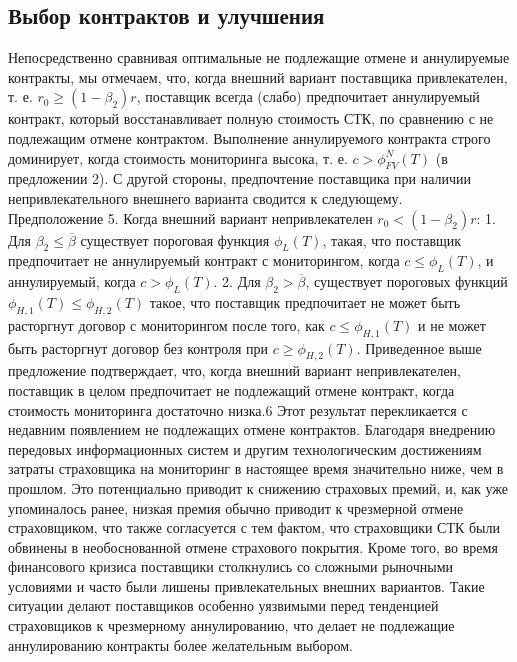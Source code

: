 \documentclass[a4paper,12pt]{article}
\begin{document}
\subsection{Выбор контрактов и улучшения}
Непосредственно сравнивая оптимальные не подлежащие отмене и аннулируемые контракты, мы отмечаем, что, когда внешний вариант поставщика привлекателен, т. е. $r_{0} \geq (1-\beta_{2})r$, поставщик всегда (слабо) предпочитает аннулируемый контракт, который восстанавливает полную стоимость СТК, по сравнению с не подлежащим отмене контрактом. Выполнение аннулируемого контракта строго доминирует, когда стоимость мониторинга высока, т. е. $c > \phi_{FV}^{N}(T)$ (в предложении 2). С другой стороны, предпочтение поставщика при наличии непривлекательного внешнего варианта сводится к следующему.
\\
Предположение 5. Когда внешний вариант непривлекателен $r_{0} < (1-\beta_{2})r$:
1. Для $\beta_{2} \leq \overline{\beta}$ существует пороговая функция $\phi_{L}(T)$, такая, что поставщик предпочитает не аннулируемый контракт с мониторингом, когда $c \leq \phi_{L}(T)$, и аннулируемый, когда $c > \phi_{L}(T)$.
2. Для $\beta_{2} > \overline{\beta}$, существует пороговых функций $\phi_{H,1}(T) \leq \phi_{H,2}(T)$ такое, что поставщик предпочитает не может быть расторгнут договор с мониторингом после того, как $c \leq \phi_{H,1}(T)$ и не может быть расторгнут договор
без контроля при $c \geq \phi_{H,2}(T)$.
Приведенное выше предложение подтверждает, что, когда внешний вариант непривлекателен, поставщик в целом предпочитает не подлежащий отмене контракт, когда стоимость мониторинга достаточно низка.6 Этот результат перекликается с недавним появлением не подлежащих отмене контрактов. Благодаря внедрению передовых информационных систем и другим технологическим достижениям затраты страховщика на мониторинг в настоящее время значительно ниже, чем в прошлом. Это потенциально приводит к снижению страховых премий, и, как уже упоминалось ранее, низкая премия обычно приводит к чрезмерной отмене страховщиком, что также согласуется с тем фактом, что страховщики СТК были обвинены в необоснованной отмене страхового покрытия. Кроме того, во время финансового кризиса поставщики столкнулись со сложными рыночными условиями и часто были лишены привлекательных внешних вариантов. Такие ситуации делают поставщиков особенно уязвимыми перед тенденцией страховщиков к чрезмерному аннулированию, что делает не подлежащие аннулированию контракты более желательным выбором.
\end{document}
